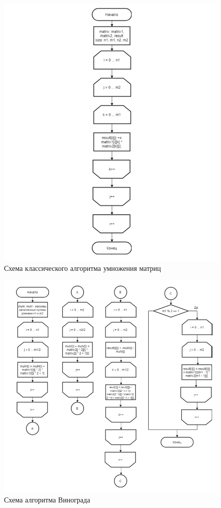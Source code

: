 \documentclass[12pt]{report}
\begin{document}
\begin{figure}[pt]
\centering
\includegraphics[scale=1]{alg1.png}
\caption{Схема классического алгоритма умножения матриц}
\label{fig:mpr}
\end{figure}

\begin{figure}[pt]
\centering
\includegraphics[scale=1]{alg2.png}
\caption{Схема алгоритма Винограда}
\label{fig:mpr}
\end{figure}
\end{document}
